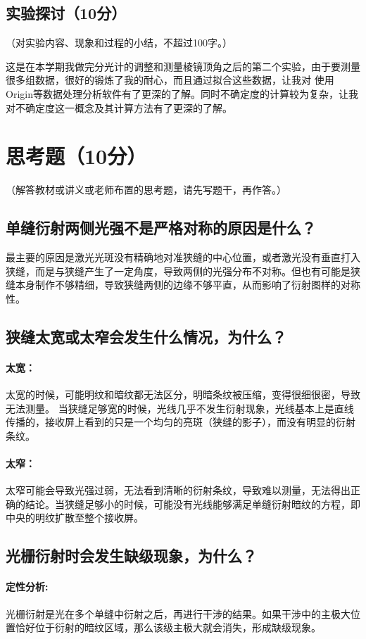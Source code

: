 \documentclass[]{../template/Report}%
\begin{document}
\begin{fullreportonly}
\subsection{实验探讨（10分）}
（对实验内容、现象和过程的小结，不超过100字。）

这是在本学期我做完分光计的调整和测量棱镜顶角之后的第二个实验，由于要测量很多组数据，很好的锻炼了我的耐心，而且通过拟合这些数据，让我对
使用Origin等数据处理分析软件有了更深的了解。同时不确定度的计算较为复杂，让我对不确定度这一概念及其计算方法有了更深的了解。
\section{思考题（10分）}
（解答教材或讲义或老师布置的思考题，请先写题干，再作答。）
\subsection{单缝衍射两侧光强不是严格对称的原因是什么？}
最主要的原因是激光光斑没有精确地对准狭缝的中心位置，或者激光没有垂直打入狭缝，而是与狭缝产生了一定角度，导致两侧的光强分布不对称。但也有可能是狭缝本身制作不够精细，导致狭缝两侧的边缘不够平直，从而影响了衍射图样的对称性。
\subsection{狭缝太宽或太窄会发生什么情况，为什么？}
\paragraph{太宽：}
太宽的时候，可能明纹和暗纹都无法区分，明暗条纹被压缩，变得很细很密，导致无法测量。
当狭缝足够宽的时候，光线几乎不发生衍射现象，光线基本上是直线传播的，接收屏上看到的只是一个均匀的亮斑（狭缝的影子），而没有明显的衍射条纹。
\paragraph{太窄：}
太窄可能会导致光强过弱，无法看到清晰的衍射条纹，导致难以测量，无法得出正确的结论。当狭缝足够小的时候，可能没有光线能够满足单缝衍射暗纹的方程，即中央的明纹扩散至整个接收屏。
\subsection{光栅衍射时会发生缺级现象，为什么？}
\paragraph{定性分析:}
光栅衍射是光在多个单缝中衍射之后，再进行干涉的结果。如果干涉中的主极大位置恰好位于衍射的暗纹区域，那么该级主极大就会消失，形成缺级现象。

\end{fullreportonly}
\end{document}
